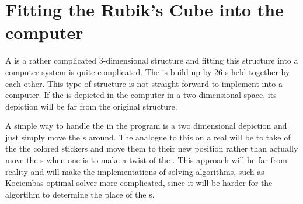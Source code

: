 \chapter{Fitting the Rubik's Cube into the computer}
A \rubik{} is a rather complicated 3-dimensional structure and fitting this structure into a computer system is quite complicated. 
The \rubik{} is build up by 26 \cpiece{}s held together by each other. 
This type of structure is not straight forward to implement into a computer. If the \rubik{} is depicted in the computer in a two-dimensional space, its depiction will be far from the original \rubik{} structure.

A simple way to handle the \rubik{} in the program is a two dimensional depiction and  just simply move the \facelet{}s around.
The analogue to this on a real \rubik{} will be to take of the the colored stickers and move them to their new position rather than actually move the \cubie{}s when one is to make a twist of the \rubik{}.
This approach will be far from reality and will make the implementations of solving algorithms, such as Kociembas optimal solver more complicated, since it will be harder for the algortihm to determine the place of the \cpiece{}s.

